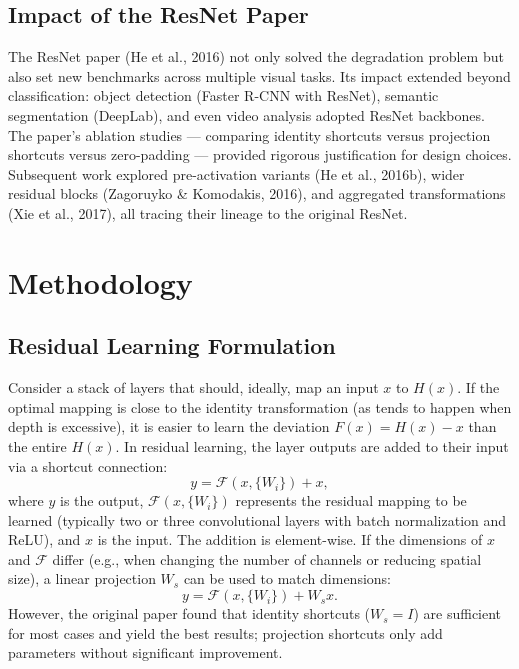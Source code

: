 \documentclass[11pt,a4paper]{article}
\begin{document}
\subsection{Impact of the ResNet Paper}
The ResNet paper (He et al., 2016) not only solved the degradation problem but also set new benchmarks across multiple visual tasks. Its impact extended beyond classification: object detection (Faster R-CNN with ResNet), semantic segmentation (DeepLab), and even video analysis adopted ResNet backbones. The paper's ablation studies — comparing identity shortcuts versus projection shortcuts versus zero-padding — provided rigorous justification for design choices. Subsequent work explored pre-activation variants (He et al., 2016b), wider residual blocks (Zagoruyko \& Komodakis, 2016), and aggregated transformations (Xie et al., 2017), all tracing their lineage to the original ResNet.

\section{Methodology}
\label{sec:method}

\subsection{Residual Learning Formulation}
Consider a stack of layers that should, ideally, map an input $x$ to $H(x)$. If the optimal mapping is close to the identity transformation (as tends to happen when depth is excessive), it is easier to learn the deviation $F(x) = H(x) - x$ than the entire $H(x)$. In residual learning, the layer outputs are added to their input via a shortcut connection:
\begin{equation}
    y = \mathcal{F}(x, \{W_i\}) + x,
    \label{eq:residual}
\end{equation}
where $y$ is the output, $\mathcal{F}(x, \{W_i\})$ represents the residual mapping to be learned (typically two or three convolutional layers with batch normalization and ReLU), and $x$ is the input. The addition is element-wise. If the dimensions of $x$ and $\mathcal{F}$ differ (e.g., when changing the number of channels or reducing spatial size), a linear projection $W_s$ can be used to match dimensions:
\begin{equation}
    y = \mathcal{F}(x, \{W_i\}) + W_s x.
    \label{eq:proj}
\end{equation}
However, the original paper found that identity shortcuts ($W_s = I$) are sufficient for most cases and yield the best results; projection shortcuts only add parameters without significant improvement.
\end{document}

